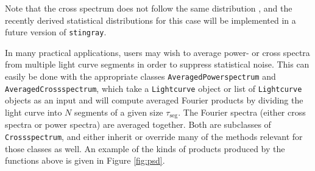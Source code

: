\documentclass[twocolumn]{aastex62}
\newcommand{\stingray}{\texttt{stingray}\xspace}
\newcommand{\lightcurve}{\texttt{Lightcurve}\xspace}
\newcommand{\crossspectrum}{\texttt{Crossspectrum}\xspace}
\newcommand{\powerspectrum}{\texttt{Powerspectrum}\xspace}
\begin{document}

Note that the cross spectrum does not follow the same distribution \citep{huppenkothen2017}, and the recently derived statistical distributions for this case will be implemented in a future version of \stingray. 

In many practical applications, users may wish to average power- or cross spectra from multiple light curve segments in order to suppress statistical noise. This can easily be done with the appropriate classes \texttt{AveragedPowerspectrum} and \texttt{AveragedCrossspectrum}, which take a \lightcurve object or list of \lightcurve objects as an input and will compute averaged Fourier products by dividing the light curve into $N$ segments of a given size $\tau_\mathrm{seg}$. The Fourier spectra (either cross spectra or power spectra) are averaged together. Both are subclasses of \crossspectrum, and either inherit or override many of the methods relevant for those classes as well. An example of the kinds of products produced by the functions above is given in Figure \ref{fig:psd}.

\end{document}
